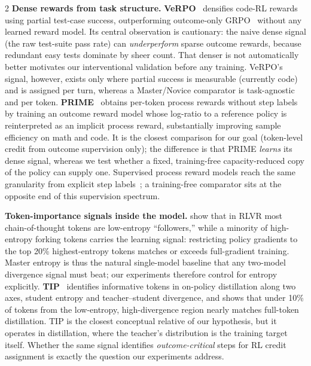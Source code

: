 \documentclass[9pt]{article}
\begin{document}
\begin{multicols}{2}
\textbf{Dense rewards from task structure.}
\textbf{VeRPO}~\citep{wang2026verpo} densifies code-RL rewards using partial
test-case success, outperforming outcome-only
GRPO~\citep{shao2024deepseekmathpushinglimitsmathematical} without any learned
reward model. Its central observation is cautionary: the naive dense signal
(the raw test-suite pass rate) can \emph{underperform} sparse outcome rewards,
because redundant easy tests dominate by sheer count. That denser is not
automatically better motivates our interventional validation before any
training. VeRPO's signal, however, exists only where partial success is
measurable (currently code) and is assigned per turn, whereas a Master/Novice
comparator is task-agnostic and per token.
\textbf{PRIME}~\citep{cui2025prime} obtains per-token process rewards without
step labels by training an outcome reward model whose log-ratio to a reference
policy is reinterpreted as an implicit process reward, substantially improving
sample efficiency on math and code. It is the closest comparison for our goal
(token-level credit from outcome supervision only); the difference is that
PRIME \emph{learns} its dense signal, whereas we test whether a fixed,
training-free capacity-reduced copy of the policy can supply one. Supervised
process reward models reach the same granularity from explicit step
labels~\citep{lightman2023letsverify,wang2023mathshepherd}; a training-free
comparator sits at the opposite end of this supervision spectrum.

\textbf{Token-importance signals inside the model.}
\citet{wang2025forking} show that in RLVR most chain-of-thought tokens are
low-entropy ``followers,'' while a minority of high-entropy forking tokens
carries the learning signal: restricting policy gradients to the top 20\%
highest-entropy tokens matches or exceeds full-gradient training. Master
entropy is thus the natural single-model baseline that any two-model
divergence signal must beat; our experiments therefore control for entropy
explicitly. \textbf{TIP}~\citep{xu2026tip} identifies informative tokens in
on-policy distillation along two axes, student entropy and teacher--student
divergence, and shows that under 10\% of tokens from the low-entropy,
high-divergence region nearly matches full-token distillation. TIP is the
closest conceptual relative of our hypothesis, but it operates in
distillation, where the teacher's distribution is the training target itself.
Whether the same signal identifies \emph{outcome-critical} steps for RL credit
assignment is exactly the question our experiments address.


\end{multicols}
\end{document}
